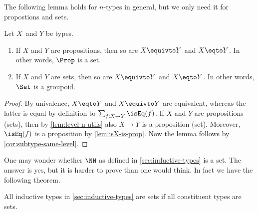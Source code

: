 The following lemma holds for $n$-types in general,
but we only need it for propostions and sets.

\begin{lemma}\label{lem:Set-is-groupoid}
Let $X$ and $Y$ be types.
\begin{enumerate}
\item
If $X$ and $Y$ are propositions, then so are $X \equivto Y$ and $X \eqto Y$.
In other words, $\Prop$ is a set.
\item
If $X$ and $Y$ are sets, then so are $X \equivto Y$ and $X \eqto Y$.
In other words, $\Set$ is a groupoid.
\end{enumerate}
\end{lemma}

\begin{proof}
 By univalence, $X \eqto Y$ and $X\equivto Y$ are equivalent,
 whereas the latter is equal by definition to $\sum_{f:X\to Y} \isEq(f)$.
 If $X$ and $Y$ are propositions (sets),
 then by \cref{lem:level-n-utils} also $X\to Y$ is a proposition (set).
 Moreover, $\isEq(f)$ is a proposition by \cref{lem:isX-is-prop}.
 Now the lemma follows by \cref{cor:subtype-same-level}.
\end{proof}

One may wonder whether $\NN$ as defined in \cref{sec:inductive-types}
is a set. The answer is yes, but it is harder to prove than one
would think. In fact we have the following theorem.

\begin{theorem}\label{thm:isset-inductive-types}
All inductive types in \cref{sec:inductive-types} are sets
if all constituent types are sets.
\end{theorem}

